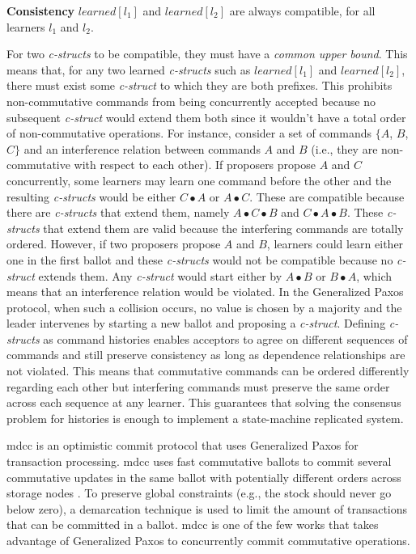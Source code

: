 \textbf{Consistency} $learned[l_1]$ and $learned[l_2]$ are always compatible, for all learners $l_1$ and $l_2$. \par
For two \textit{c-structs} to be compatible, they must have a \textit{common upper bound}. This means that, for any two learned \textit{c-structs} such as $learned[l_1]$ and $learned[l_2]$, there must exist some \textit{c-struct} to which they are both prefixes. This prohibits non-commutative commands from being concurrently accepted because no subsequent \textit{c-struct} would extend them both since it wouldn't have a total order of non-commutative operations. For instance, consider a set of commands $\lbrace A$, $B$, $C\rbrace$ and an interference relation between commands $A$ and $B$ (i.e., they are non-commutative with respect to each other). If proposers propose $A$ and $C$ concurrently, some learners may learn one command before the other and the resulting \textit{c-structs} would be either $C \bullet A$ or $A \bullet C$. These are compatible because there are \textit{c-structs} that extend them, namely $A \bullet C \bullet B$ and $C \bullet A \bullet B$. These \textit{c-structs} that extend them are valid because the interfering commands are totally ordered. However, if two proposers propose $A$ and $B$, learners could learn either one in the first ballot and these \textit{c-structs} would not be compatible because no \textit{c-struct} extends them. Any \textit{c-struct} would start either by $A \bullet B$ or $B \bullet A$, which means that an interference relation would be violated. In the Generalized Paxos protocol, when such a collision occurs, no value is chosen by a majority and the leader intervenes by starting a new ballot and proposing a \textit{c-struct}. Defining \textit{c-structs} as command histories enables acceptors to agree on different sequences of commands and still preserve consistency as long as dependence relationships are not violated. This means that commutative commands can be ordered differently regarding each other but interfering commands must preserve the same order across each sequence at any learner. This guarantees that solving the consensus problem for histories is enough to implement a state-machine replicated system. \par
\acrfull{mdcc} is an optimistic commit protocol that uses Generalized Paxos for transaction processing. \acrshort{mdcc} uses fast commutative ballots to commit several commutative updates in the same ballot with potentially different orders across storage nodes \cite{Kraska2013}. To preserve global constraints (e.g., the stock should never go below zero), a demarcation technique is used to limit the amount of transactions that can be committed in a ballot. \acrshort{mdcc} is one of the few works that takes advantage of Generalized Paxos to concurrently commit commutative operations.\par

